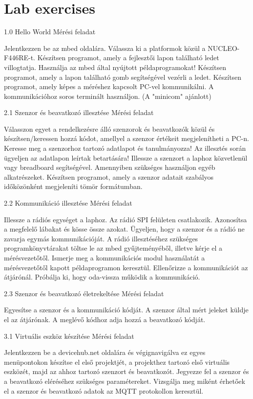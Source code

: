 \documentclass[a4paper]{article}
\begin{document}
\section{Lab exercises}

1.0 Hello World
Mérési feladat

    Jelentkezzen be az mbed oldalára. Válassza ki a platformok közül a NUCLEO-F446RE-t.
    Készítsen programot, amely a fejlesztői lapon található ledet villogtatja.
    Használja az mbed által nyújtott példaprogramokat!
    Készítsen programot, amely a lapon található gomb segítségével vezérli a ledet.
    Készítsen programot, amely képes a méréshez kapcsolt PC-vel kommunikálni. A kommunikációhoz soros terminált használjon. (A "minicom" ajánlott)

2.1 Szenzor és beavatkozó illesztése
Mérési feladat

    Válasszon egyet a rendelkezésre álló szenzorok és beavatkozók közül és készítsen/keressen hozzá kódot, amellyel a szenzor értékeit megjelenítheti a PC-n.
    Keresse meg a szenzorhoz tartozó adatlapot és tanulmányozza! Az illesztés során ügyeljen az adatlapon leírtak betartására!
    Illessze a szenzort a laphoz közvetlenül vagy breadboard segítségével. Amennyiben szükséges használjon egyéb alkatrészeket.
    Készítsen programot, amely a szenzor adatait szabályos időközönként megjeleníti tömör formátumban.

2.2 Kommunikáció illesztése
Mérési feladat

    Illessze a rádiós egységet a laphoz. Az rádió SPI felületen csatlakozik. Azonosítsa a megfelelő lábakat és kösse össze azokat. Ügyeljen, hogy a szenzor és a rádió ne zavarja egymás kommunikációját.
    A rádió illesztéséhez szükséges programkönyvtárakat töltse le az mbed gyűjteményéből, illetve kérje el a mérésvezetőtől.
    Ismerje meg a kommunikációs modul használatát a mérésvezetőtől kapott példaprogramon keresztül.
    Ellenőrizze a kommunikációt az átjárónál. Próbálja ki, hogy oda-vissza működik a kommunikáció.

2.3 Szenzor és beavatkozó életrekeltése
Mérési feladat

    Egyesítse a szenzor és a kommunikáció kódját. A szenzor által mért jeleket küldje el az átjárónak.
    A meglévő kódhoz adja hozzá a beavatkozó kódját.

3.1 Virtuális eszköz készítése
Mérési feladat

    Jelentkezzen be a devicehub.net oldalára és végignavigálva ez egyes menüpontokon készítse el első projektjét, a projekthez tartozó első virtuális eszközét, majd az ahhoz tartozó szenzort és beavatkozót.
    Jegyezze fel a szenzor és a beavatkozó eléréséhez szükséges paramétereket.
    Vizsgálja meg miként érhetőek el a szenzor és beavatkozó adatok az MQTT protokollon keresztül.
\end{document}
